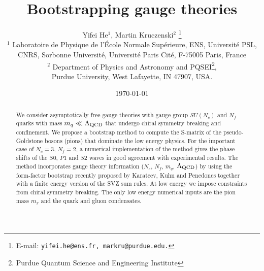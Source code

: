 \documentclass[12pt,letterpaper]{article}
\newcommand{\lqcd}{\ensuremath{\Lambda_{\mbox{\scriptsize QCD}}}}
\begin{document}


\title{\Large \bf Bootstrapping gauge theories}

\author{
	Yifei He$^\text{1}$,
	Martin Kruczenski$^\text{2}$ \thanks{E-mail: \texttt{yifei.he@ens.fr, markru@purdue.edu.}} \\
[2.0mm]
$^1$ \small Laboratoire de Physique de l'\'Ecole Normale Supérieure, ENS, Université PSL,\\
\small CNRS, Sorbonne Université, Université Paris Cité, F-75005 Paris, France \\
$^2$ \small Department of Physics and Astronomy and PQSEI\thanks{Purdue Quantum Science and Engineering Institute}, \\
\small Purdue University, West Lafayette, IN 47907, USA.}

\date{\today}

\maketitle

\begin{abstract}
 We consider asymptotically free gauge theories with gauge group $SU(N_c)$ and $N_f$ quarks with mass $m_q\ll \lqcd$ that undergo chiral symmetry breaking and confinement. We propose a bootstrap method to compute the S-matrix of the pseudo-Goldstone bosons (pions) that dominate the low energy physics. For the important case of $N_c=3$, $N_f=2$, a numerical implementation of the method gives the phase shifts of the $S0$, $P1$ and $S2$ waves in good agreement with experimental results. The method incorporates gauge theory information ($N_c$, $N_f$, $m_q$, $\lqcd$) by using the form-factor bootstrap recently proposed by Karateev, Kuhn and Penedones together with a finite energy version of the SVZ sum rules. At low energy we impose constraints from chiral symmetry breaking. The only low energy numerical inputs are the pion mass $m_\pi$ and the quark and gluon condensates.
\end{abstract}

\clearpage

\tableofcontents

\newpage
\end{document}
